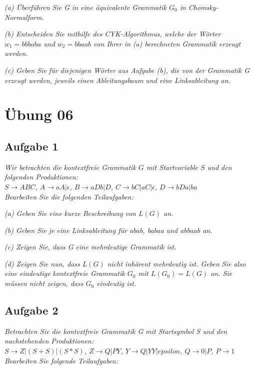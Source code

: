 \documentclass[a4paper]{article}
\begin{document}
\textit{(a) Überführen Sie G in eine äquivalente Grammatik $G_0$ in Chomsky-Normalform.}

\textit{(b) Entscheiden Sie mithilfe des CYK-Algorithmus, welche der Wörter $w_1 = bbbaba$ und $w_2 = bbaab$ von Ihrer in (a) berechneten Grammatik erzeugt werden.}

\textit{(c) Geben Sie für diejenigen Wörter aus Aufgabe (b), die von der Grammatik G erzeugt werden, jeweils einen Ableitungsbaum und eine Linksableitung an.}



\newpage
\section{Übung 06}
\subsection{Aufgabe 1}
\textit{Wir betrachten die kontextfreie Grammatik $G$ mit Startvariable $S$ und den folgenden Produktionen:\\
$S\rightarrow ABC$, $A\rightarrow aA |\epsilon$, $B\rightarrow aDb | D$, $C \rightarrow bC | aC | \epsilon$, $D \rightarrow bDa | ba$\\
Bearbeiten Sie die folgenden Teilaufgaben:}

\textit{(a) Geben Sie eine kurze Beschreibung von $L(G)$ an.}

\textit{(b) Geben Sie je eine Linksableitung für abab, babaa und abbaab an.}

\textit{(c) Zeigen Sie, dass G eine mehrdeutige Grammatik ist.}

\textit{(d) Zeigen Sie nun, dass $L(G)$ nicht inhärent mehrdeutig ist. Geben Sie also eine eindeutige kontextfreie Grammatik $G_0$ mit $L(G_0) = L(G)$ an. Sie müssen nicht zeigen, dass $G_0$ eindeutig ist.}

\subsection{Aufgabe 2}
\textit{Betrachten Sie die kontextfreie Grammatik G mit Startsymbol S und den nachstehenden Produktionen:\\
$S\rightarrow Z | (S + S) | (S * S)$, $Z\rightarrow Q | PY$, $Y\rightarrow Q | YY | epsilon$, 
$Q\rightarrow 0 | P$, $P\rightarrow 1$\\
Bearbeiten Sie folgende Teilaufgaben:}
\end{document}
